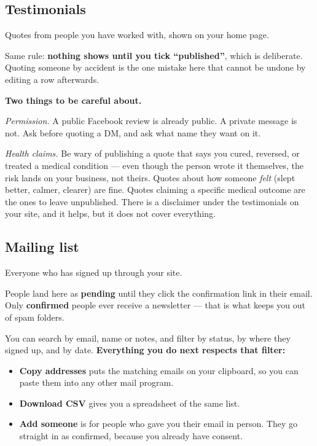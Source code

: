 \documentclass[11pt,a4paper]{article}
\newenvironment{callout}
  {\par\medskip\noindent\begin{list}{}{%
     \setlength{\leftmargin}{1.2em}\setlength{\rightmargin}{0pt}%
     \setlength{\labelwidth}{0pt}\setlength{\itemindent}{0pt}}%
   \item[]\color{ink}\hspace{-1.2em}%
   \makebox[0pt][l]{\raisebox{-0.35\baselineskip}[0pt][0pt]{%
     \textcolor{gold}{\rule{2pt}{1.15\baselineskip}}}}\hspace{1.2em}\ignorespaces}
  {\end{list}\medskip}
\newcommand{\lead}[1]{\textbf{\color{ink}#1}}
\begin{document}
\subsection{Testimonials}

Quotes from people you have worked with, shown on your home page.

Same rule: \textbf{nothing shows until you tick ``published''}, which is
deliberate. Quoting someone by accident is the one mistake here that cannot be
undone by editing a row afterwards.

\begin{callout}
\lead{Two things to be careful about.}

\emph{Permission.} A public Facebook review is already public. A private
message is not. Ask before quoting a DM, and ask what name they want on it.

\emph{Health claims.} Be wary of publishing a quote that says you cured,
reversed, or treated a medical condition --- even though the person wrote it
themselves, the risk lands on your business, not theirs. Quotes about how
someone \emph{felt} (slept better, calmer, clearer) are fine. Quotes claiming
a specific medical outcome are the ones to leave unpublished. There is a
disclaimer under the testimonials on your site, and it helps, but it does not
cover everything.
\end{callout}

\subsection{Mailing list}

Everyone who has signed up through your site.

People land here as \textbf{pending} until they click the confirmation link in
their email. Only \textbf{confirmed} people ever receive a newsletter --- that
is what keeps you out of spam folders.

You can search by email, name or notes, and filter by status, by where they
signed up, and by date. \lead{Everything you do next respects that filter:}

\begin{itemize}
  \item \lead{Copy addresses} puts the matching emails on your clipboard, so
        you can paste them into any other mail program.
  \item \lead{Download CSV} gives you a spreadsheet of the same list.
  \item \lead{Add someone} is for people who gave you their email in person.
        They go straight in as confirmed, because you already have consent.
\end{itemize}
\end{document}
